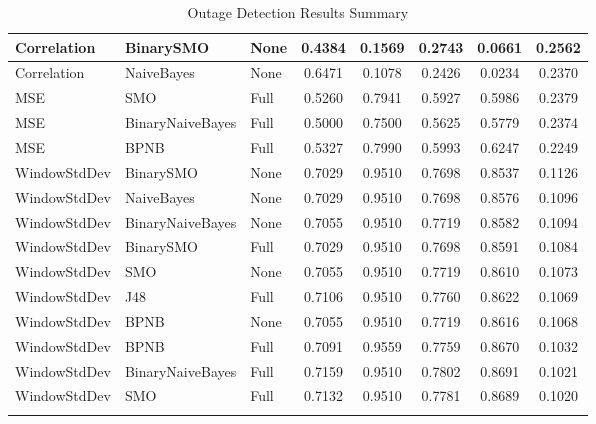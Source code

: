 {\begin{longtable}{|l|l|l|c|c|c|c|c|}
      \tabularnewline\hline
         Correlation & BinarySMO & None & 0.4384 & 0.1569 & 0.2743 & 0.0661 & 0.2562
      \tabularnewline\hline
         Correlation & NaiveBayes & None & 0.6471 & 0.1078 & 0.2426 & 0.0234 & 0.2370
      \tabularnewline\hline
         MSE & SMO & Full & 0.5260 & 0.7941 & 0.5927 & 0.5986 & 0.2379
      \tabularnewline\hline
         MSE & BinaryNaiveBayes & Full & 0.5000 & 0.7500 & 0.5625 & 0.5779 & 0.2374
      \tabularnewline\hline
         MSE & BPNB & Full & 0.5327 & 0.7990 & 0.5993 & 0.6247 & 0.2249
      \tabularnewline\hline
         WindowStdDev & BinarySMO & None & 0.7029 & 0.9510 & 0.7698 & 0.8537 & 0.1126
      \tabularnewline\hline
         WindowStdDev & NaiveBayes & None & 0.7029 & 0.9510 & 0.7698 & 0.8576 & 0.1096
      \tabularnewline\hline
         WindowStdDev & BinaryNaiveBayes & None & 0.7055 & 0.9510 & 0.7719 & 0.8582 & 0.1094
      \tabularnewline\hline
         WindowStdDev & BinarySMO & Full & 0.7029 & 0.9510 & 0.7698 & 0.8591 & 0.1084
      \tabularnewline\hline
         WindowStdDev & SMO & None & 0.7055 & 0.9510 & 0.7719 & 0.8610 & 0.1073
      \tabularnewline\hline
         WindowStdDev & J48 & Full & 0.7106 & 0.9510 & 0.7760 & 0.8622 & 0.1069
      \tabularnewline\hline
         WindowStdDev & BPNB & None & 0.7055 & 0.9510 & 0.7719 & 0.8616 & 0.1068
      \tabularnewline\hline
         WindowStdDev & BPNB & Full & 0.7091 & 0.9559 & 0.7759 & 0.8670 & 0.1032
      \tabularnewline\hline
         WindowStdDev & BinaryNaiveBayes & Full & 0.7159 & 0.9510 & 0.7802 & 0.8691 & 0.1021
      \tabularnewline\hline
         WindowStdDev & SMO & Full & 0.7132 & 0.9510 & 0.7781 & 0.8689 & 0.1020
      \tabularnewline\hline
      \caption[Outage Detection Results Summary]{Outage Detection Results Summary}
      \label{table:outage-detection-summary}
   \end{longtable}
}
